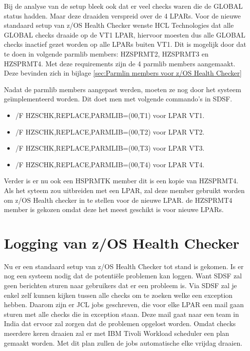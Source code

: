 Bij de analyse van de setup bleek ook dat er veel checks waren die de GLOBAL status hadden. Maar deze draaiden verspreid over de 4 LPARs. Voor de nieuwe standaard setup van z/OS Health Checker wenste HCL Technologies dat alle GLOBAL checks draaide op de VT1 LPAR, hiervoor moesten dus alle GLOBAL checks inactief gezet worden op alle LPARs buiten VT1. Dit is mogelijk door dat te doen in volgende parmlib members: HZSPRMT2, HZSPRMT3 en HZSPRMT4. Met deze requirements zijn de 4 parmlib members aangemaakt. Deze bevinden zich in bijlage \ref{sec:Parmlin members voor z/OS Health Checker}

Nadat de parmlib members aangepast werden, moeten ze nog door het systeem geïmplementeerd worden. Dit doet men met volgende commando's in SDSF.

\begin{itemize}
	\item /F HZSCHK,REPLACE,PARMLIB=(00,T1) voor LPAR VT1. 
	\item /F HZSCHK,REPLACE,PARMLIB=(00,T2) voor LPAR VT2.
	\item /F HZSCHK,REPLACE,PARMLIB=(00,T3) voor LPAR VT3.
	\item /F HZSCHK,REPLACE,PARMLIB=(00,T4) voor LPAR VT4.
\end{itemize}

Verder is er nu ook een HSPRMTK member dit is een kopie van HZSPRMT4. Als het syteem zou uitbreiden met een LPAR, zal deze member gebruikt worden om z/OS Health checker in te stellen voor de nieuwe LPAR. de HZSPRMT4 member is gekozen omdat deze het meest geschikt is voor nieuwe LPARs.

\section{Logging van z/OS Health Checker}
\label{sec:Logging van z/OS Health Checker}

Nu er een standaard setup van z/OS Health Checker tot stand is gekomen. Is er nog een systeem nodig dat de potentiële problemen kan loggen. Want SDSF zal geen berichten sturen naar gebruikers dat er een probleem is. Via SDSF zal je enkel zelf kunnen kijken tussen alle checks om te zoeken welke een exception hebben. Daarom zijn er JCL jobs geschreven, die voor elke LPAR een mail gaan sturen met alle checks die in exception staan. Deze mail gaat naar een team in India dat ervoor zal zorgen dat de problemen opgelost worden. Omdat checks meerdere keren draaien zal er met IBM Tivoli Workload scheduler een plan gemaakt worden. Met dit plan zullen de jobs automatische elke vrijdag draaien.

